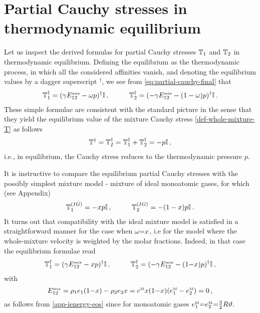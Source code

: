 \documentclass[a4paper]{article}
\begin{document}
\section{Partial Cauchy stresses in thermodynamic equilibrium }
\label{sec-partical-cauchy-equilibrium}
Let us inspect the derived formulas for partial Cauchy stresses $\TT_1$ and $\TT_2$ in thermodynamic equilibrium. Defining the equilibrium as the thermodynamic process, in which all the considered affinities vanish, and denoting the equilibrium values by a dagger superscript $^\dag$, we see from \eqref{eq:partial-cauchy-final} that 
\begin{align}
\TT_1^\dag = (\gamma\EEEmix - \weight p)^\dag\II\,,\hspace{1cm}
\TT_2^\dag = (-\gamma\EEEmix - (1-\weight)p)^\dag\II\,.
\end{align}
These simple formulae are consistent with the standard picture in the sense that they yield the equilibrium value of the mixture Cauchy stress \eqref{def-whole-mixture-T} as follows
\begin{align}
\TT^\dag = \TT_I^\dag = \TT_1^\dag+\TT_2^\dag = -p\II\,, 
\end{align}
i.e., in equilibrium, the Cauchy stress reduces to the thermodynamic pressure $p$.

It is instructive to compare the equilibrium partial Cauchy stresses with the possibly simplest mixture model - mixture of ideal monoatomic gases, for which (see Appendix)
\begin{align}
    \TT^{(IG)}_1 = -xp\II\,,\hspace{1cm}\TT^{(IG)}_2 = -(1-x)p\II\,.
\end{align}
It turns out that compatibility with the ideal mixture model is satisfied in a straightforward manner for the case when $\weight{=}x$, i.e for the model where the whole-mixture velocity is weighted by the molar fractions. Indeed, in that case the equilibrium formulae read
\begin{align}
\TT^\dag_1 = (\gamma\EEEmix-xp)^\dag\II\,,\hspace{1cm}\TT^\dag_2 = (-\gamma\EEEmix - (1{-}x)p)^\dag\II\,,
\end{align}
with
\begin{equation}
\EEEmix = \rho_1 e_1(1{-}x) - \rho_2 e_2 x = \cm x(1{-}x)(\em_1-\em_2) = 0\,,
\end{equation}
as follows from \eqref{app-ienergy-eos} since for monoatomic gases $\em_1{=}\em_2{=}\frac{3}{2}R\vartheta$.
\end{document}
